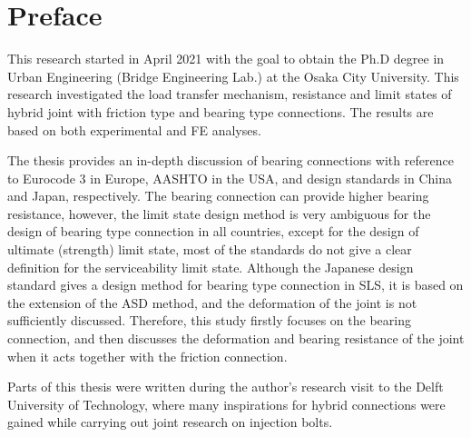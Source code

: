 \cleardoublepage{}
{}\mtcaddchapter 
\chapter*{Preface}
\addtocounter{counter}{-1}


This research started in April 2021 with the goal to obtain the Ph.D degree in Urban Engineering (Bridge Engineering Lab.) at the Osaka City University. This research investigated the load transfer mechanism, resistance and limit states of hybrid joint with friction type and bearing type connections. The results are based on both experimental and FE analyses.

The thesis provides an in-depth discussion of bearing connections with reference to Eurocode 3 in Europe, AASHTO in the USA, and design standards in China and Japan, respectively. The bearing connection can provide higher bearing resistance, however, the limit state design method is very ambiguous for the design of bearing type connection in all countries, except for the design of ultimate (strength) limit state, most of the standards do not give a clear definition for the serviceability limit state. Although the Japanese design standard gives a design method for bearing type connection in SLS, it is based on the extension of the ASD method, and the deformation of the joint is not sufficiently discussed. Therefore, this study firstly focuses on the bearing connection, and then discusses the deformation and bearing resistance of the joint when it acts together with the friction connection.

Parts of this thesis were written during the author's research visit to the Delft University of Technology, where many inspirations for hybrid connections were gained while carrying out joint research on injection bolts.

